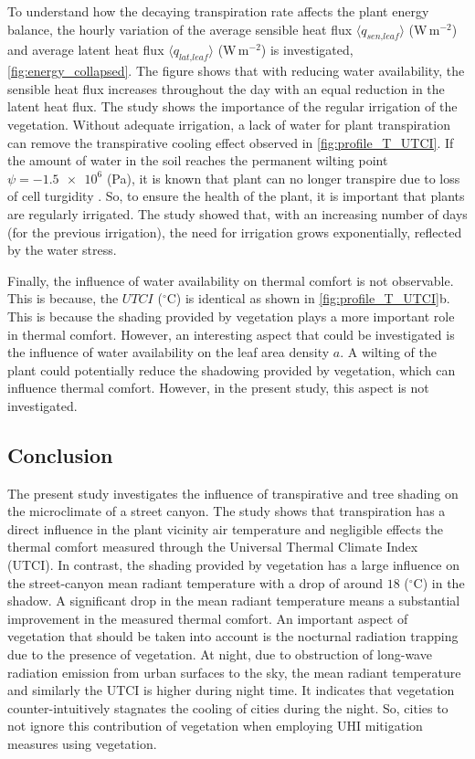 To understand how the decaying transpiration rate affects the plant energy balance, the hourly variation of the average sensible heat flux $\langle q_{\textit{sen,leaf}} \rangle$ (W\,m$^{-2}$) and  average latent heat flux $\langle q_{\textit{lat,leaf}} \rangle$ (W\,m$^{-2}$) is investigated, \cref{fig:energy_collapsed}. The figure shows that with reducing water availability, the sensible heat flux increases throughout the day with an equal reduction in the latent heat flux. The study shows the importance of the regular irrigation of the vegetation. Without adequate irrigation, a lack of water for plant transpiration can remove the transpirative cooling effect observed in \cref{fig:profile_T_UTCI}. If the amount of water in the soil reaches the permanent wilting point $\psi = \num{-1.5e6}$ (Pa), it is known that plant can no longer transpire due to loss of cell turgidity \citep{Idso1977}. So, to ensure the health of the plant, it is important that plants are regularly irrigated. The study showed that, with an increasing number of days (for the previous irrigation), the need for irrigation grows exponentially, reflected by the water stress.

Finally, the influence of water availability on thermal comfort is not observable. This is because, the $UTCI$  ($^{\circ}$C) is identical as shown in \cref{fig:profile_T_UTCI}b. This is because the shading provided by vegetation plays a more important role in thermal comfort. However, an interesting aspect that could be investigated is the influence of water availability on the leaf area density $a$. A wilting of the plant could potentially reduce the shadowing provided by vegetation, which can influence thermal comfort. However, in the present study, this aspect is not investigated.


\subsection{Conclusion}

The present study investigates the influence of transpirative and tree shading on the microclimate of a street canyon. The study shows that transpiration has a direct influence in the plant vicinity air temperature and negligible effects the thermal comfort measured through the Universal Thermal Climate Index (UTCI). In contrast, the shading provided by vegetation has a large influence on the street-canyon mean radiant temperature with a drop of around $18$ ($^{\circ}$C) in the shadow. A significant drop in the mean radiant temperature means a substantial improvement in the measured thermal comfort. An important aspect of vegetation that should be taken into account is the nocturnal radiation trapping due to the presence of vegetation. At night, due to obstruction of long-wave radiation emission from urban surfaces to the sky, the mean radiant temperature and similarly the UTCI is higher during night time. It indicates that vegetation counter-intuitively stagnates the cooling of cities during the night. So, cities to not ignore this contribution of vegetation when employing UHI mitigation measures using vegetation.

